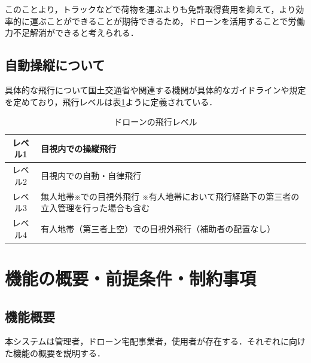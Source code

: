 \documentclass[a4paper, titlepage]{jsarticle}
\begin{document}
このことより，トラックなどで荷物を運ぶよりも免許取得費用を抑えて，より効率的に運ぶことができることが期待できるため，ドローンを活用することで労働力不足解消ができると考えられる．


\subsection{自動操縦について}
具体的な飛行について国土交通省や関連する機関が具体的なガイドラインや規定を定めており，飛行レベルは表\ref{tab:dron_level}ように定義されている．
\begin{table}[htbp]
        \centering
        \label{tab:dron_level}
        \caption{ドローンの飛行レベル}
        \begin{tabular}{|c|l|}
                \hline
                レベル1 & 目視内での操縦飛行                    \\ \hline
                レベル2 & 目視内での自動・自律飛行                 \\ \hline
                レベル3 & 無人地帯※での目視外飛行
                ※有人地帯において飛行経路下の第三者の立入管理を行った場合も含む    \\ \hline
                レベル4 & 有人地帯（第三者上空）での目視外飛行（補助者の配置なし） \\ \hline
        \end{tabular}
\end{table}



\section{機能の概要・前提条件・制約事項}
\subsection{機能概要}
本システムは管理者，ドローン宅配事業者，使用者が存在する．それぞれに向けた機能の概要を説明する．
\end{document}
